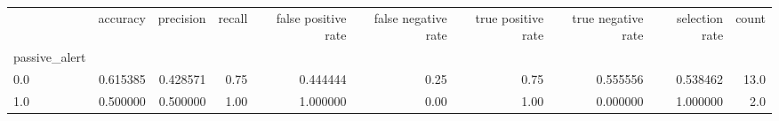 \begin{tabular}{lrrrrrrrrr}
\toprule
{} &  accuracy &  precision &  recall &  false positive rate &  false negative rate &  true positive rate &  true negative rate &  selection rate &  count \\
passive\_alert &           &            &         &                      &                      &                     &                     &                 &        \\
\midrule
0.0           &  0.615385 &   0.428571 &    0.75 &             0.444444 &                 0.25 &                0.75 &            0.555556 &        0.538462 &   13.0 \\
1.0           &  0.500000 &   0.500000 &    1.00 &             1.000000 &                 0.00 &                1.00 &            0.000000 &        1.000000 &    2.0 \\
\bottomrule
\end{tabular}
